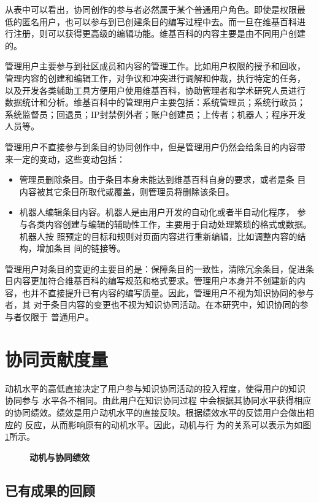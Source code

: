 从表中可以看出，协同创作的参与者必然属于某个普通用户角色。即使是权限最
低的匿名用户，也可以参与到已创建条目的编写过程中去。而一旦在维基百科进
行注册，则可以获得更高级的编辑功能。维基百科的内容主要是由不同用户创建
的。

管理用户主要参与到社区成员和内容的管理工作。比如用户权限的授予和回收，
管理内容的创建和编辑工作，对争议和冲突进行调解和仲裁，执行特定的任务，
以及开发各类辅助工具方便用户使用维基百科，协助管理者和学术研究人员进行
数据统计和分析。维基百科中的管理用户主要包括：系统管理员；系统行政员；
系统监督员；回退员；IP封禁例外者；账户创建员；上传者；机器人；程序开发
人员等。

管理用户不直接参与到条目的协同创作中，但是管理用户仍然会给条目的内容带
来一定的变动，这些变动包括：
\begin{itemize}
\item 管理员删除条目。由于条目本身未能达到维基百科自身的要求，或者是条
  目内容被其它条目所取代或覆盖，则管理员将删除该条目。
\item 机器人编辑条目内容。机器人是由用户开发的自动化或者半自动化程序，
  参与各类内容创建与编辑的辅助性工作，主要用于自动处理繁琐的格式或数据。机器人按
照预定的目标和规则对页面内容进行重新编辑，比如调整内容的结构，增加条目
间的链接等。
\end{itemize}
管理用户对条目的变更的主要目的是：保障条目的一致性，清除冗余条目，促进条
目内容更加符合维基百科的编写规范和格式要求。管理用户本身并不创建新的内
容，也并不直接提升已有内容的编写质量。因此，管理用户不视为知识协同的参与者，其
对于条目内容的变更也不视为知识协同活动。在本研究中，知识协同的参与者仅限于
普通用户。

\section{协同贡献度量}
动机水平的高低直接决定了用户参与知识协同活动的投入程度，使得用户的知识
协同参与
水平各不相同。由此用户在知识协同过程
中会根据其协同水平获得相应的协同绩效。绩效是用户动机水平的直接反映\cite{Zhang2006}。根据绩效水平的反馈用户会做出相应的
反应，从而影响原有的动机水平\cite{gist1992self}。因此，动机与行
为的关系可以表示为如图\ref{fig:motive-behaviour}所示。

\begin{figure}[!htb]
  \centering
  \caption{\small{\textbf{动机与协同绩效}}}
  \label{fig:motive-behaviour}
\end{figure}
\subsection{已有成果的回顾}

